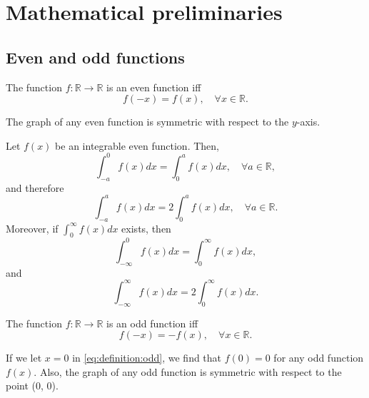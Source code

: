 \chapter{Mathematical preliminaries}

\section{Even and odd functions}

\begin{definition}
    The function \(f : \mathbb{R} \rightarrow \mathbb{R}\) is an even function iff
    \begin{equation}
        f(-x) = f(x), \quad \forall x \in \mathbb{R}.
    \end{equation}
\end{definition}
The graph of any even function is symmetric with respect to the \(y\)-axis.

\begin{lemma}
    Let \(f(x)\) be an integrable even function. Then,
    \begin{equation}
        \int_{-a}^{0} f(x) dx = \int_{0}^{a} f(x) dx, \quad \forall a \in \mathbb{R},
    \end{equation}
    and therefore
    \begin{equation}
        \int_{-a}^{a} f(x) dx = 2 \int_{0}^{a} f(x) dx, \quad \forall a \in \mathbb{R}.
    \end{equation}
    Moreover, if \(\int_{0}^{\infty} f(x) dx\) exists, then
    \begin{equation}
        \int_{-\infty}^{0} f(x) dx = \int_{0}^{\infty} f(x) dx,
    \end{equation}
    and
    \begin{equation}
        \int_{-\infty}^{\infty} f(x) dx = 2 \int_{0}^{\infty} f(x) dx.
    \end{equation}
\end{lemma}

\begin{definition}
    The function \(f : \mathbb{R} \rightarrow \mathbb{R}\) is an odd function iff
    \begin{equation}
        f(-x) = -f(x), \quad \forall x \in \mathbb{R}.
        \label{eq:definition:odd}
    \end{equation}
\end{definition}
If we let \(x = 0\) in \eqref{eq:definition:odd}, we find that \(f(0) = 0\) for any odd function \(f(x)\).
Also, the graph of any odd function is symmetric with respect to the point (0, 0).

